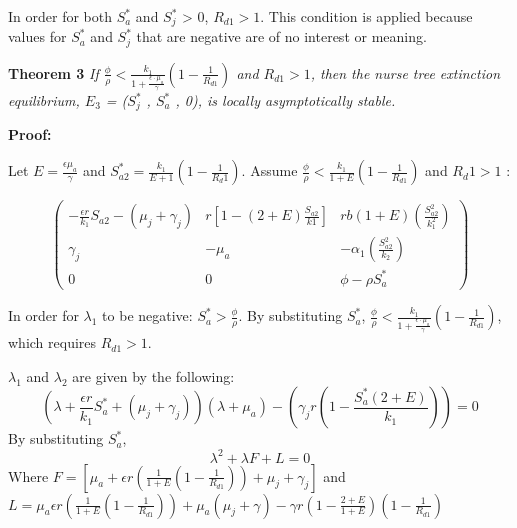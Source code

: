 \documentclass[a4paper]{article}
\begin{document}
In order for both $S_a^*$ and $S_j^*$ > 0, $R_{d1} > 1$. This condition is applied because values for $S_a^*$ and $S_j^*$ that are negative are of no interest or meaning. \newline




\textbf{Theorem 3} \textit{If $\displaystyle\frac {\phi}{\rho} < \displaystyle \frac{k_1}{1+\displaystyle\frac{\epsilon\cdot\mu_a}{\gamma}}(1-\displaystyle\frac{1}{R_{d1}}) $ and $R_{d1} > 1$, then the nurse tree extinction equilibrium, $E_3$ = ($S^*_j$ , $S^*_a$ , 0), is locally asymptotically stable.} \newline

\textbf{Proof:}\newline

Let $E = \frac{\epsilon\mu_a}{\gamma}$ and $S_{a2}^* = \displaystyle\frac{k_1}{E+1}(1-\frac{1}{R_d1})$. Assume $\displaystyle\frac {\phi}{\rho} < \displaystyle \frac{k_1}{1+E}(1-\displaystyle\frac{1}{R_{d1}}) $ and $R_d1 > 1$ :\newline

$$\begin{pmatrix}
-\frac{{\epsilon}r}{k_1}S_{a2}-({\mu_j} + {\gamma_j}) & r\left[1-(2+E)\frac{S_{a2}}{k1}\right] &  rb(1+E)\left(\frac{S_{a2}^2}{k^2_1}\right)\\

\gamma_j & -\mu_a & -{\alpha_1}\left(\frac{S_{a2}^2}{k_2}\right)\\

0 & 0 & \phi-\rho S_a^*
\end{pmatrix}$$\newline

In order for $\lambda_1$ to be negative: $S_a^* > \frac{\phi}{\rho}$. By substituting $S_a^*$, $\displaystyle\frac {\phi}{\rho} < \displaystyle \frac{k_1}{1+\displaystyle\frac{\epsilon\cdot\mu_a}{\gamma}}\left(1-\displaystyle\frac{1}{R_{d1}}\right) $, which requires $R_{d1} > 1$.\newline

$\lambda_1$ and $\lambda_2$ are given by the following:
\begin{equation*}
\left(\lambda + \frac{\epsilon r}{k_1}S_a^* + (\mu_j + \gamma_j)\right)(\lambda + \mu_a) - \left(\gamma_jr \left(1 - \frac{S_a^* (2 + E)}{k_1}\right)\right) = 0
\end{equation*}
By substituting $S_a^*$,
\begin{equation*}
\lambda^2+\lambda F + L = 0 \end{equation*}
Where $F = \left[\mu_a+\epsilon r\left(\displaystyle\frac{1}{1+E}\left(1 - \displaystyle\frac{1}{R_{d1}}\right)\right) + \mu_j + \gamma_j \right]$ and $L = \mu_a \epsilon r\left(\frac{1}{1+E}\left(1 - \displaystyle\frac{1}{R_{d1}}\right)\right) + \mu_a \left(\mu_j + \gamma \right) - \gamma r (1-\displaystyle\frac{2+E}{1+E})\left(1-\displaystyle\frac{1}{R_{d1}}\right)$
\end{document}
